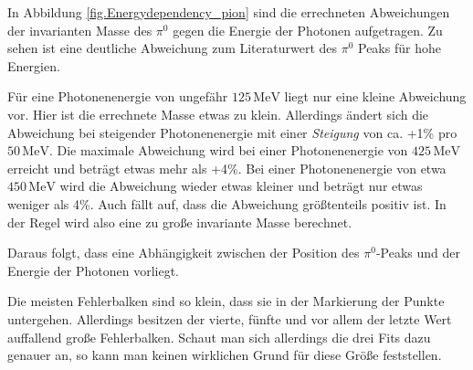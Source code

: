 \documentclass[a4paper,11pt,oneside,final,german,openbib,pdftex]{scrbook}
\begin{document}
{In Abbildung \ref{fig.Energydependency_pion} sind die errechneten Abweichungen der invarianten Masse des $\pi^0$ gegen die Energie der Photonen aufgetragen. Zu sehen ist eine deutliche Abweichung zum Literaturwert des $\pi^0$ Peaks für hohe Energien. 

F\"ur eine Photonenenergie von ungef\"ahr $125\,\text{MeV}$ liegt nur eine kleine Abweichung vor. Hier ist die errechnete Masse etwas zu klein. Allerdings \"andert sich die Abweichung bei steigender Photonenenergie mit einer \textit{Steigung} von ca. +1\% pro $50\,\text{MeV}$. Die maximale Abweichung wird bei einer Photonenenergie von $425\,\text{MeV}$ erreicht und betr\"agt etwas mehr als +4\%. Bei einer Photonenenergie von etwa $450\,\text{MeV}$ wird die Abweichung wieder etwas kleiner und betr\"agt nur etwas weniger als 4\%.
Auch fällt auf, dass die Abweichung größtenteils positiv ist. In der Regel wird also eine zu gro{\ss}e invariante Masse berechnet.

Daraus folgt, dass eine Abhängigkeit zwischen der Position des $\pi^0$-Peaks und der Energie der Photonen vorliegt. 



Die meisten Fehlerbalken sind so klein, dass sie in der Markierung der Punkte untergehen. Allerdings besitzen der vierte, f\"unfte und vor allem der letzte Wert auffallend große Fehlerbalken. Schaut man sich allerdings die drei Fits dazu genauer an, so kann man keinen wirklichen Grund für diese Größe feststellen.




}
\end{document}
